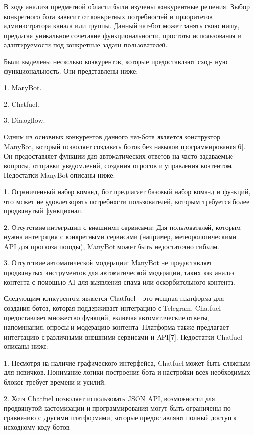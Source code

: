 В ходе анализа предметной области были изучены конкурентные решения. Выбор конкретного бота зависит от конкретных потребностей и приоритетов администратора канала или группы. Данный чат-бот может занять свою нишу, предлагая уникальное сочетание функциональности, простоты использования и адаптируемости под конкретные задачи пользователей.

Были выделены несколько конкурентов, которые предоставляют сход- ную функциональность. Они представлены ниже:

1.	ManyBot.

2.	Chatfuel.

3.	Dialogflow.

Одним из основных конкурентов данного чат-бота является конструктор ManyBot, который позволяет создавать ботов без навыков программирования[6]. Он предоставляет функции для автоматических ответов на часто задаваемые вопросы, отправки уведомлений, создания опросов и управления контентом. Недостатки ManyBot описаны ниже:

1.	Ограниченный набор команд, бот предлагает базовый набор команд и функций, что может не удовлетворять потребности пользователей, которым требуется более продвинутый функционал.

2.	Отсутствие интеграции с внешними сервисами: Для пользователей, которым нужна интеграция с конкретными сервисами (например, метеорологическими API для прогноза погоды), ManyBot может быть недостаточно гибким.

3.	Отсутствие автоматической модерации: ManyBot не предоставляет продвинутых инструментов для автоматической модерации, таких как анализ контента с помощью AI для выявления спама или оскорбительного контента.

Следующим конкурентом является Chatfuel – это мощная платформа для создания ботов, которая поддерживает интеграцию с Telegram. Chatfuel предоставляет множество функций, включая автоматические ответы, напоминания, опросы и модерацию контента. Платформа также предлагает интеграцию с различными внешними сервисами и API[7]. Недостатки Chatfuel описаны ниже:

1.	Несмотря на наличие графического интерфейса, Chatfuel может быть сложным для новичков. Понимание логики построения бота и настройки всех необходимых блоков требует времени и усилий.

2.	Хотя Chatfuel позволяет использовать JSON API, возможности для продвинутой кастомизации и программирования могут быть ограничены по сравнению с другими платформами, которые предоставляют полный доступ к исходному коду ботов.


